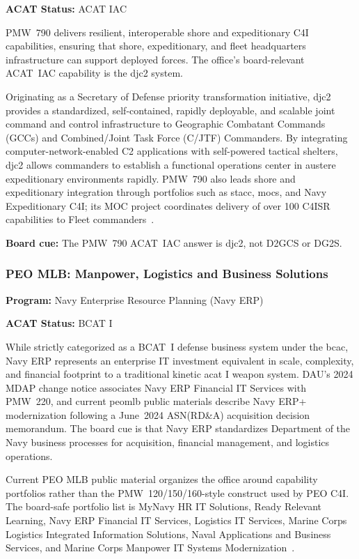 \documentclass[../main.tex]{subfiles}
\begin{document}
\textbf{ACAT Status:} ACAT IAC~\autocite{PEOC4I-PMW790-tearsheet-2025}

PMW~790 delivers resilient, interoperable shore and expeditionary C4I capabilities, ensuring that shore, expeditionary, and fleet headquarters infrastructure can support deployed forces. The office's board-relevant ACAT~IAC capability is the \ac{djc2} system.

Originating as a Secretary of Defense priority transformation initiative, \ac{djc2} provides a standardized, self-contained, rapidly deployable, and scalable joint command and control infrastructure to Geographic Combatant Commands (GCCs) and Combined/Joint Task Force (C/JTF) Commanders. By integrating computer-network-enabled C2 applications with self-powered tactical shelters, \ac{djc2} allows commanders to establish a functional operations center in austere expeditionary environments rapidly. PMW~790 also leads shore and expeditionary integration through portfolios such as \ac{stacc}, \acp{moc}, and Navy Expeditionary C4I; its MOC project coordinates delivery of over 100 C4ISR capabilities to Fleet commanders~\autocite{PEOC4I-PMW790-tearsheet-2025}.

\textbf{Board cue:} The PMW~790 ACAT~IAC answer is \ac{djc2}, not D2GCS or DG2S.

\subsubsection{PEO MLB: Manpower, Logistics and Business Solutions}
\label{ssubsec:peomlb}

\textbf{Program:} Navy Enterprise Resource Planning (Navy ERP)

\textbf{ACAT Status:} BCAT I~\autocite{DAU-MDAP-Changes-2024,PEOMLB-portfolio-book-2025}

While strictly categorized as a BCAT~I defense business system under the \ac{bcac}, Navy ERP represents an enterprise IT investment equivalent in scale, complexity, and financial footprint to a traditional kinetic \ac{acat} I weapon system. DAU's 2024 MDAP change notice associates Navy ERP Financial IT Services with PMW~220, and current \ac{peomlb} public materials describe Navy ERP+ modernization following a June~2024 ASN(RD\&A) acquisition decision memorandum. The board cue is that Navy ERP standardizes Department of the Navy business processes for acquisition, financial management, and logistics operations.

Current PEO MLB public material organizes the office around capability portfolios rather than the PMW~120/150/160-style construct used by PEO C4I. The board-safe portfolio list is MyNavy HR IT Solutions, Ready Relevant Learning, Navy ERP Financial IT Services, Logistics IT Services, Marine Corps Logistics Integrated Information Solutions, Naval Applications and Business Services, and Marine Corps Manpower IT Systems Modernization~\autocite{PEOMLB-portfolio-book-2025}.
\end{document}
